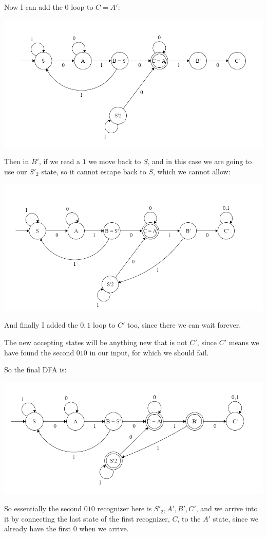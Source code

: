 Now I can add the $0$ loop to $C = A'$:

\begin{center}
    \includegraphics[width=\linewidth]{./exams/02/step_4.png}
\end{center}

Then in $B'$, if we read a $1$ we move back to $S$, and in this case we are going to use our $S'_2$ state, so it cannot escape back to $S$, which we cannot allow:

\begin{center}
    \includegraphics[width=\linewidth]{./exams/02/step_5.png}
\end{center}

And finally I added the $0,1$ loop to $C'$ too, since there we can wait forever.

The new accepting states will be anything new that is not $C'$, since $C'$ means we have found the second $010$ in our input, for which we should fail.

So the final DFA is:

\begin{center}
    \includegraphics[width=\linewidth]{./exams/02/step_6.png}
\end{center}

So essentially the second $010$ recognizer here is $S'_2, A', B', C'$, and we arrive into it by connecting the last state of the first recognizer, $C$, to the $A'$ state, since we already have the first $0$ when we arrive.
